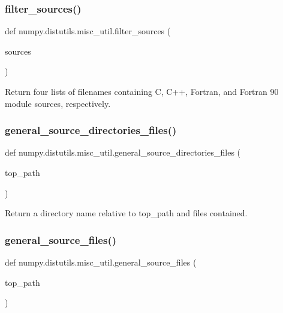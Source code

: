 \subsubsection{\texorpdfstring{filter\+\_\+sources()}{filter\_sources()}}
{\footnotesize\ttfamily def numpy.\+distutils.\+misc\+\_\+util.\+filter\+\_\+sources (\begin{DoxyParamCaption}\item[{}]{sources }\end{DoxyParamCaption})}

\begin{DoxyVerb}Return four lists of filenames containing
C, C++, Fortran, and Fortran 90 module sources,
respectively.
\end{DoxyVerb}
 \mbox{\label{namespacenumpy_1_1distutils_1_1misc__util_a5dd53a8de1d5c7765792afd9cd2fb73b}} 
\subsubsection{\texorpdfstring{general\+\_\+source\+\_\+directories\+\_\+files()}{general\_source\_directories\_files()}}
{\footnotesize\ttfamily def numpy.\+distutils.\+misc\+\_\+util.\+general\+\_\+source\+\_\+directories\+\_\+files (\begin{DoxyParamCaption}\item[{}]{top\+\_\+path }\end{DoxyParamCaption})}

\begin{DoxyVerb}Return a directory name relative to top_path and
files contained.
\end{DoxyVerb}
 \mbox{\label{namespacenumpy_1_1distutils_1_1misc__util_a32bb9c885361138c2e924ec2c3ec2b91}} 
\subsubsection{\texorpdfstring{general\+\_\+source\+\_\+files()}{general\_source\_files()}}
{\footnotesize\ttfamily def numpy.\+distutils.\+misc\+\_\+util.\+general\+\_\+source\+\_\+files (\begin{DoxyParamCaption}\item[{}]{top\+\_\+path }\end{DoxyParamCaption})}

